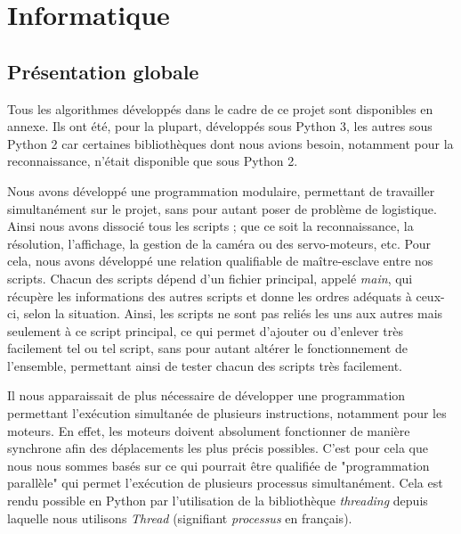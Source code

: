 \documentclass[12pt,a4paper]{report}
\begin{document}
	\chapter{Informatique}
\section{Présentation globale}
	Tous les algorithmes développés dans le cadre de ce projet sont disponibles en annexe. Ils ont été, pour la plupart, développés sous Python 3, les autres sous Python 2 car certaines bibliothèques dont nous avions besoin, notamment pour la reconnaissance, n'était disponible que sous Python 2. 
	
	Nous avons développé une programmation modulaire, permettant de travailler simultanément sur le projet, sans pour autant poser de problème de logistique. Ainsi nous avons dissocié tous les scripts ; que ce soit la reconnaissance, la résolution, l'affichage, la gestion de la caméra ou des servo-moteurs, etc. Pour cela, nous avons développé une relation qualifiable de maître-esclave entre nos scripts. Chacun des scripts dépend d'un fichier principal, appelé \emph{main}, qui récupère les informations des autres scripts et donne les ordres adéquats à ceux-ci, selon la situation. Ainsi, les scripts ne sont pas reliés les uns aux autres mais seulement à ce script principal, ce qui permet d'ajouter ou d'enlever très facilement tel ou tel script, sans pour autant altérer le fonctionnement de l'ensemble, permettant ainsi de tester chacun des scripts très facilement.
	
	Il nous apparaissait de plus nécessaire de développer une programmation permettant l'exécution simultanée de plusieurs instructions, notamment pour les moteurs. En effet, les moteurs doivent absolument fonctionner de manière synchrone afin des déplacements les plus précis possibles. C'est pour cela que nous nous sommes basés sur ce qui pourrait être qualifiée de "programmation parallèle" qui permet l'exécution de plusieurs processus simultanément. Cela est rendu possible en Python par l'utilisation de la bibliothèque \emph{threading} depuis laquelle nous utilisons \emph{Thread} (signifiant \emph{processus} en français).
	
\newpage
\end{document}
